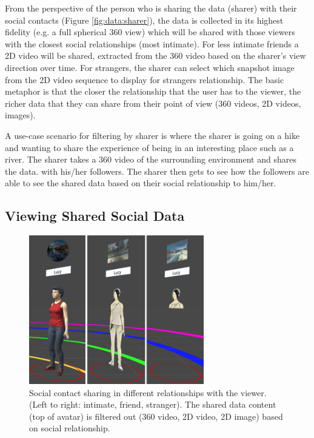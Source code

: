 From the perspective of the person who is sharing the data (sharer) with their social contacts (Figure \ref{fig:data:sharer}), the data is collected in its highest fidelity (e.g. a full spherical 360 view) which will be shared with those viewers with the closest social relationships (most intimate). For less intimate friends a 2D video will be shared, extracted from the 360 video based on the sharer's view direction over time. For strangers, the sharer can select which snapshot image from the 2D video sequence to display for strangers relationship. The basic metaphor is that the closer the relationship that the user has to the viewer, the richer data that they can share from their point of view (360 videos, 2D videos, images).

A use-case scenario for filtering by sharer is where the sharer is going on a hike and wanting to share the experience of being in an interesting place such as a river. The sharer takes a 360 video of the surrounding environment and shares the data. with his/her followers. The sharer then gets to see how the followers are able to see the shared data based on their social relationship to him/her.

\subsection{Viewing Shared Social Data}

\begin{figure}[ht]
	\centering
	\includegraphics[width=3in]{images/chi/3_levels_of_data.png}
	\caption{Social contact sharing in different relationships with the viewer. (Left to right: intimate, friend, stranger). The shared data content (top of avatar) is filtered out (360 video, 2D video, 2D image) based on social relationship.}
  	\label{fig:data:viewer}
\end{figure}

